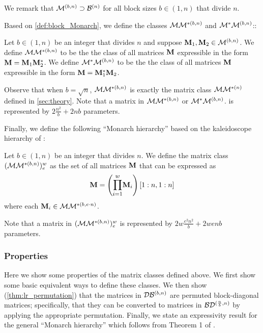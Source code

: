 We remark that $\mathcal{M}^{(b,n)} \supset \mathcal{B}^{(n)}$ for all block sizes $b \in (1, n)$ that divide $n$.

Based on \cref{def:block_Monarch}, we define the classes $\M\M^{*(b,n)}$ and $\M^*\M^{(b,n)}$::
\begin{definition}[Class $\M\M^{*(b,n)}$, $\M^*\M^{(b,n)}$]
\label{def:block_MM}
Let $b \in (1, n)$ be an integer that divides $n$ and suppose $\mathbf{M}_1, \mathbf{M}_2 \in \mathcal{M}^{(b,n)}$. We define $\M\M^{*(b,n)}$ to be the the class of all matrices $\mathbf{M}$ expressible in the form $\mathbf{M}= \mathbf{M}_1 \mathbf{M}_2^*$. \newline
We define $\M^*\M^{(b,n)}$ to be the the class of all matrices $\mathbf{M}$ expressible in the form $\mathbf{M}= \mathbf{M}_1^* \mathbf{M}_2$.
\end{definition}
Observe that when $b = \sqrt{n}$, $\M\M^{*(b,n)}$ is exactly the matrix class $\mathcal{M}\mathcal{M}^{*(n)}$ defined in \cref{sec:theory}. Note that a matrix in $\M\M^{*(b,n)}$ or $\mathcal{M}^*\mathcal{M}^{(b,n)}$. is represented by $2\frac{n^2}{b} + 2nb$ parameters.

Finally, we define the following ``Monarch hierarchy'' based on the kaleidoscope hierarchy of \cite{dao2020kaleidoscope}:
\begin{definition}[Class $(\M\M^{*(b,n)})^w_e$]
\label{def:block_MM}
Let $b \in (1, n)$ be an integer that divides $n$. We define the matrix class $(\M\M^{*(b,n)})^w_e$ as the set of all matrices $\mathbf{M}$ that can be expressed as
    \begin{equation}
        	\label{eq:mm-hierarchy}
    \vM= \lt \pd{i=1}{w} \vM_i\rt [1:n, 1:n]
    \end{equation}
    where each $\mathbf{M}_i \in \mathcal{M}\mathcal{M}^{*(b,e\cdot n)}$.
\end{definition}
Note that a matrix in $(\M\M^{*(b,n)})^w_e$ is represented by $2w\frac{e^2n^2}{b} + 2wenb$ parameters.

\subsubsection{Properties}
\label{sec:sq-Monarch-properties}
Here we show some properties of the matrix classes defined above. We first show some basic equivalent ways to define these classes. We then show (\cref{thm:lr_permutation}) that the matrices in $\mathcal{D}\mathcal{B}^{(b, n)}$ are permuted block-diagonal matrices; specifically, that they can be converted to matrices in $\mathcal{B}\mathcal{D}^{(\frac{n}{b}, n)}$ by applying the appropriate permutation. Finally, we state an expressivity result for the general ``Monarch hierarchy''  which follows from Theorem 1 of \cite{dao2020kaleidoscope}.

